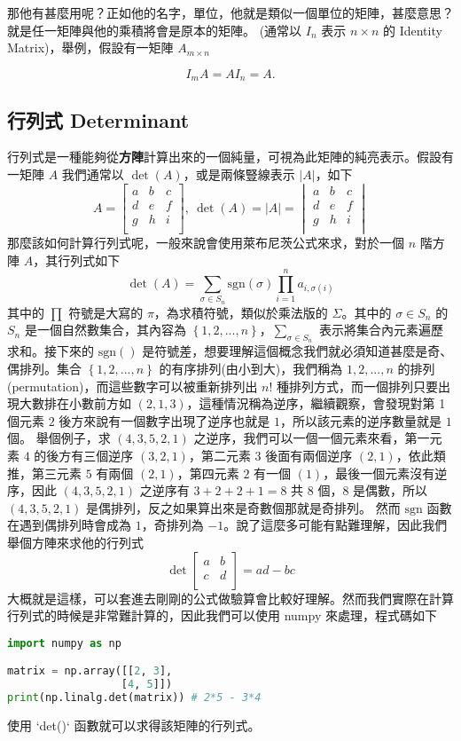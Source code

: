 \documentclass[11pt]{article}
\begin{document}
那他有甚麼用呢？正如他的名字，單位，他就是類似一個單位的矩陣，甚麼意思？就是任一矩陣與他的乘積將會是原本的矩陣。 (通常以 $I_n$ 表示 $n \times n$ 的 Identity Matrix)，舉例，假設有一矩陣 $A_{m \times n}$

$$
  I_m A = A I_n = A.
$$

\subsection{行列式 Determinant}
行列式是一種能夠從\textbf{方陣}計算出來的一個純量，可視為此矩陣的純亮表示。假設有一矩陣 $A$ 我們通常以 $\det(A)$，或是兩條豎線表示 $|A|$，如下
\[
  A = \begin{bmatrix}
    a & b & c \\
    d & e & f \\
    g & h & i \\
  \end{bmatrix}
  , \ \det(A) = |A| = \begin{vmatrix}
    a & b & c \\
    d & e & f \\
    g & h & i \\
  \end{vmatrix}
\]
那麼該如何計算行列式呢，一般來說會使用萊布尼茨公式來求，對於一個 $n$ 階方陣 $A$，其行列式如下
\[
  \det(A) = \sum_{\sigma \in S_n} \mathrm{sgn}(\sigma) \prod_{i=1}^n a_{i,\sigma(i)}
\]
其中的 $\prod$ 符號是大寫的 $\pi$，為求積符號，類似於乘法版的 $\Sigma$。其中的 $\sigma \in S_n$ 的 $S_n$ 是一個自然數集合，其內容為 $\left \{ 1,2,...,n \right \}
$，$\sum_{\sigma \in S_n}$ 表示將集合內元素遍歷求和。接下來的 $\mathrm{sgn}()$ 是符號差，想要理解這個概念我們就必須知道甚麼是奇、偶排列。集合 $\left \{ 1,2,...,n \right \}$ 的有序排列(由小到大)，我們稱為 $1,2,...,n$ 的排列(permutation)，而這些數字可以被重新排列出 $n!$ 種排列方式，而一個排列只要出現大數排在小數前方如 $(2, 1, 3)$，這種情況稱為逆序，繼續觀察，會發現對第 1 個元素 $2$ 後方來說有一個數字出現了逆序也就是 $1$，所以該元素的逆序數量就是 $1$ 個。
舉個例子，求 $(4, 3, 5, 2, 1)$ 之逆序，我們可以一個一個元素來看，第一元素 $4$ 的後方有三個逆序 $(3, 2, 1)$，第二元素 $3$ 後面有兩個逆序 $(2, 1)$，依此類推，第三元素 $5$ 有兩個 $(2, 1)$，第四元素 $2$ 有一個 $(1)$，最後一個元素沒有逆序，因此 $(4, 3, 5, 2, 1)$ 之逆序有 $3 + 2 + 2 + 1 = 8$ 共 8 個，8 是偶數，所以 $(4, 3, 5, 2, 1)$ 是偶排列，反之如果算出來是奇數個那就是奇排列。
然而 $\mathrm{sgn}$ 函數在遇到偶排列時會成為 $1$，奇排列為 $-1$。說了這麼多可能有點難理解，因此我們舉個方陣來求他的行列式
\[
  \det
  \begin{bmatrix}
    a & b\\
    c & d\\
  \end{bmatrix}
  = 
  ad - bc
\]
大概就是這樣，可以套進去剛剛的公式做驗算會比較好理解。然而我們實際在計算行列式的時候是非常難計算的，因此我們可以使用 numpy 來處理，程式碼如下
\begin{lstlisting}[language=python]
import numpy as np

matrix = np.array([[2, 3], 
                  [4, 5]])
print(np.linalg.det(matrix)) # 2*5 - 3*4
\end{lstlisting}
使用 `det()` 函數就可以求得該矩陣的行列式。
\end{document}
